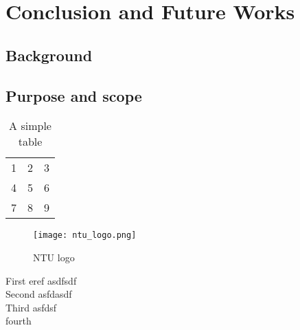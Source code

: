 \chapter{Conclusion and Future Works}
\section{Background}
\section{Purpose and scope }


\begin{table}[h!]
  \begin{center}
    \begin{tabular}{| l c r |}
    \hline
    1 & 2 & 3 \\
    4 & 5 & 6 \\
    7 & 8 & 9 \\
    \hline
    \end{tabular}
  \end{center}
  \caption{A simple table}
\end{table}

\begin{figure}[h!]  
  \centering
    \texttt{[image: ntu\_logo.png]}
  \caption{NTU logo}
\end{figure}


First eref \cite{Hao14} asdfsdf \\

Second \cite{Beyl11} asfdasdf \\

Third \cite{Bona05} asfdsf\\

fourth \cite{Ohi91} \\
